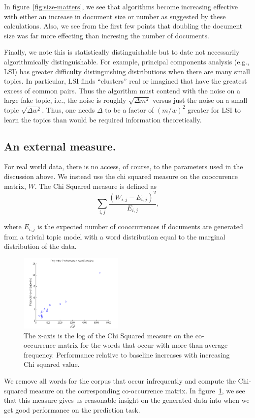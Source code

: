 In figure~\ref{fig:size-matters}, we see that algorithms become
increasing effective with either an increase in document size or
number as suggested by these calculations.  Also, we see from
the first few points that doubling the document size
was far more effecting than incresing the number of documents.

Finally, we note this is statistically distinguishable but to date not
necessarily algorithmically distinguishable.  For example, principal
components analysis (e.g., LSI) has greater difficulty distinguishing
distributions when there are many small topics.  In particular, LSI
finds ``clusters'' real or imagined that have the greatest excess of
common pairs.  Thus the algorithm must contend with the noise on a
large fake topic, i.e., the noise is roughly $\sqrt{ \Delta m^2}$
versus just the noise on a small topic $\sqrt{\Delta w^2}$.  Thus, one
needs $\Delta$ to be a factor of $(m/w)^2$ greater for LSI to learn
the topics than would be required information theoretically.




\subsection{An external measure.}


For real world data, there is no access, of course, to the parameters
used in the discussion above. We instead use the chi squared measure on
the cooccurence matrix, $W$.  The Chi Squared measure  is defined as $$\sum_{i,j} \frac{(W_{i,j} -
E_{i,j})^2}{E_{i,j}},$$

where $E_{i,j}$ is the expected number of cooccurrences if
documents are generated from a trivial topic model with
a word distribution equal to the marginal distribution
of the data. 


\begin{figure}
     \begin{center}
            \includegraphics[width=0.45\textwidth]{x2.png}

    \end{center}
    \caption{The x-axis is the log of the Chi Squared measure on the co-occurrence matrix for the words that occur with more than average frequency. Performance relative to baseline increases with increasing Chi squared value.}
   \label{fig:x2}
\end{figure}


We remove all words for the corpus that occur infrequently and
compute the Chi-squared measure on the corresponding co-occurrence
matrix.  In figure~\ref{fig:x2}, we see that this measure 
gives us reasonable insight on the generated data
into when we get good performance on the prediction
task. 


